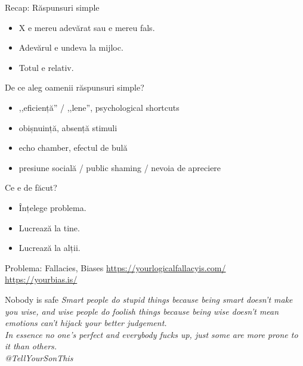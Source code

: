 \documentclass{simple}
\begin{document}
\begin{frame}{Recap: Răspunsuri simple}
  \begin{itemize}
    \item X e mereu adevărat sau e mereu fals.
    \item Adevărul e undeva la mijloc.
    \item Totul e relativ.
  \end{itemize}
\end{frame}

\begin{frame}{De ce aleg oamenii răspunsuri simple?}
  \begin{itemize}
    \pause
    \item ,,eficiență'' / ,,lene'', psychological shortcuts
    \pause
    \item obișnuință, absență stimuli
    \pause
    \item echo chamber, efectul de bulă
    \pause
    \item presiune socială / public shaming / nevoia de apreciere
  \end{itemize}
\end{frame}

\begin{frame}{Ce e de făcut?}
  \begin{itemize}
    \pause
    \item Înțelege problema.
    \pause
    \item Lucrează la tine.
    \pause
    \item Lucrează la alții.
  \end{itemize}
\end{frame}

\begin{frame}{Problema: Fallacies, Biases}
  \centering
  \url{https://yourlogicalfallacyis.com/} \\
  \url{https://yourbias.is/}
\end{frame}

\begin{frame}{Nobody is safe}
  \textit{Smart people do stupid things because being smart doesn't make you wise, and wise people do foolish things because being wise doesn't mean emotions can't hijack your better judgement. \\
  In essence no one's perfect and everybody fucks up, just some are more prone to it than others.} \\
  \vspace{3mm}
  \hfill \textit{@TellYourSonThis}
\end{frame}
\end{document}
